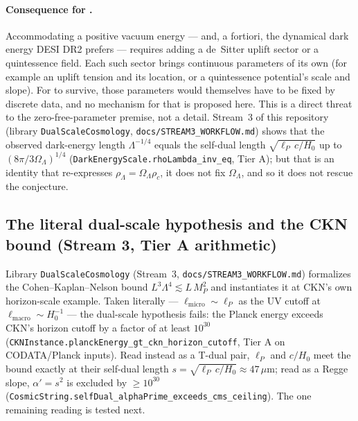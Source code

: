 \documentclass[11pt,a4paper]{article}
\theoremstyle{remark}
\begin{document}
\paragraph{Consequence for .} Accommodating a positive vacuum energy --- and, a
fortiori, the dynamical dark energy DESI DR2 prefers --- requires adding a de~Sitter uplift sector or a
quintessence field. Each such sector brings continuous parameters of its own (for example an uplift
tension and its location, or a quintessence potential's scale and slope). For  to
survive, those parameters would themselves have to be fixed by discrete data, and no mechanism for that
is proposed here. This is a direct threat to the zero-free-parameter premise, not a detail. Stream~3 of
this repository (library \texttt{DualScaleCosmology}, \texttt{docs/STREAM3\_WORKFLOW.md}) shows that the
observed dark-energy length $\Lambda^{-1/4}$ equals the self-dual length $\sqrt{\ell_P\,c/H_0}$ up to
$(8\pi/3\Omega_\Lambda)^{1/4}$ (\texttt{DarkEnergyScale.rhoLambda\_inv\_eq}, Tier A); but that is an
identity that re-expresses $\rho_\Lambda=\Omega_\Lambda\rho_c$, it does not fix $\Omega_\Lambda$, and so
it does not rescue the conjecture.

\subsection{The literal dual-scale hypothesis and the CKN bound (Stream 3, Tier A arithmetic)}
\label{sec:ckn-verdict}
Library \texttt{DualScaleCosmology} (Stream~3, \texttt{docs/STREAM3\_WORKFLOW.md}) formalizes the
Cohen--Kaplan--Nelson bound $L^3\Lambda^4\lesssim L\,M_P^2$ \cite{CKN1999} and instantiates it at CKN's own
horizon-scale example. Taken literally --- $\ell_{\mathrm{micro}}\sim\ell_P$ as the UV cutoff at
$\ell_{\mathrm{macro}}\sim H_0^{-1}$ --- the dual-scale hypothesis fails: the Planck energy exceeds CKN's
horizon cutoff by a factor of at least $10^{30}$
(\texttt{CKNInstance.\discretionary{}{}{}planckEnergy\_\discretionary{}{}{}gt\_\discretionary{}{}{}ckn\_\discretionary{}{}{}horizon\_\discretionary{}{}{}cutoff},
Tier A on CODATA/Planck inputs). Read instead as a T-dual pair, $\ell_P$ and $c/H_0$ meet the bound
exactly at their self-dual length $s=\sqrt{\ell_P\,c/H_0}\approx47\,\mu$m; read as a Regge slope,
$\alpha'=s^2$ is excluded by $\ge10^{30}$ (\texttt{CosmicString.\discretionary{}{}{}selfDual\_\discretionary{}{}{}alphaPrime\_\discretionary{}{}{}exceeds\_\discretionary{}{}{}cms\_\discretionary{}{}{}ceiling}).
The one remaining reading is tested next.
\end{document}
